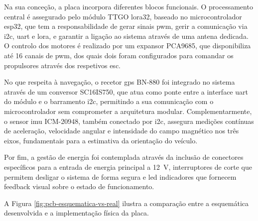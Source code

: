 Na sua conceção, a placa incorpora diferentes blocos funcionais. O processamento central é assegurado pelo módulo TTGO \gls{lora}32, baseado no microcontrolador \gls{esp32}, que tem a responsabilidade de gerar sinais \gls{pwm}, gerir a comunicação via \gls{i2c}, \gls{uart} e \gls{lora}, e garantir a ligação ao sistema através de uma antena dedicada. O controlo dos motores é realizado por um expansor PCA9685, que disponibiliza até 16 canais de \gls{pwm}, dos quais dois foram configurados para comandar os propulsores através dos respetivos \gls{esc}.  

No que respeita à navegação, o recetor \gls{gps} BN-880 foi integrado no sistema através de um conversor SC16IS750, que atua como ponte entre a interface \gls{uart} do módulo e o barramento \gls{i2c}, permitindo a sua comunicação com o microcontrolador sem comprometer a arquitetura modular. Complementarmente, o sensor \gls{imu} ICM-20948, também conectado por \gls{i2c}, assegura medições contínuas de aceleração, velocidade angular e intensidade do campo magnético nos três eixos, fundamentais para a estimativa da orientação do veículo.  

Por fim, a gestão de energia foi contemplada através da inclusão de conectores específicos para a entrada de energia principal a 12~V, interruptores de corte que permitem desligar o sistema de forma segura e \gls{led} indicadores que fornecem feedback visual sobre o estado de funcionamento.  

A Figura \ref{fig:pcb-esquematica-vs-real} ilustra a comparação entre a esquemática desenvolvida e a implementação física da placa.

